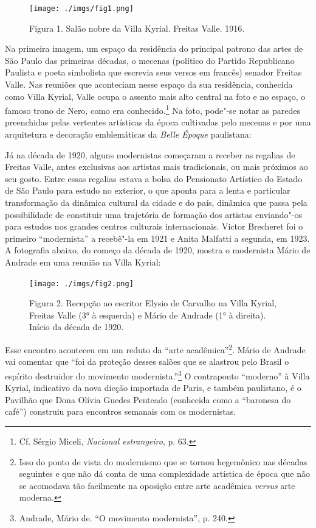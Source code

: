\begin{figure}[!ht]
\centering
 \texttt{[image: ./imgs/fig1.png]}
\caption{Figura 1. Salão nobre da Villa Kyrial. Freitas Valle. 1916.}
\end{figure}

Na primeira imagem, um espaço da residência do principal patrono das
artes de São Paulo das primeiras décadas, o mecenas (político do Partido
Republicano Paulista e poeta simbolista que escrevia seus versos em
francês) senador Freitas Valle. Nas reuniões que aconteciam nesse espaço
da sua residência, conhecida como Villa Kyrial, Valle ocupa o assento
mais alto central na foto e no espaço, o famoso trono de Nero, como era
conhecido.\footnote{Cf. Sérgio Miceli, \emph{Nacional estrangeiro}, p.
  63.} Na foto, pode"-se notar as paredes preenchidas pelas vertentes
artísticas da época cultivadas pelo mecenas e por uma arquitetura e
decoração emblemáticas da \emph{Belle Époque} paulistana:

Já na década de 1920, alguns modernistas começaram a receber as regalias
de Freitas Valle, antes exclusivas aos artistas mais tradicionais, ou
mais próximos ao seu gosto. Entre essas regalias estava a bolsa do
Pensionato Artístico do Estado de São Paulo para estudo no exterior, o
que aponta para a lenta e particular transformação da dinâmica cultural
da cidade e do país, dinâmica que passa pela possibilidade de constituir
uma trajetória de formação dos artistas enviando"-os para estudos nos
grandes centros culturais internacionais. Victor Brecheret foi o
primeiro ``modernista'' a recebê"-la em 1921 e Anita Malfatti a segunda,
em 1923. A fotografia abaixo, do começo da década de 1920, mostra o
modernista Mário de Andrade em uma reunião na Villa Kyrial:

\begin{figure}[!ht]
\centering
 \texttt{[image: ./imgs/fig2.png]}
\caption{Figura 2. Recepção ao escritor Elysio de Carvalho na Villa Kyrial,
Freitas Valle (3° à esquerda) e Mário de Andrade (1° à direita). Início
da década de 1920.}
\end{figure}


Esse encontro aconteceu em um reduto da ``arte acadêmica''\footnote{Isso
  do ponto de vista do modernismo que se tornou hegemônico nas décadas
  seguintes e que não dá conta de uma complexidade artística de época
  que não se acomodava tão facilmente na oposição entre arte acadêmica
  \emph{versus} arte moderna.}. Mário de Andrade vai comentar que ``foi
da proteção desses salões que se alastrou pelo Brasil o espírito
destruidor do movimento modernista.''\footnote{Andrade, Mário de. ``O
  movimento modernista'', p. 240.} O contraponto ``moderno'' à Villa
Kyrial, indicativo da nova dicção importada de Paris, e também
paulistano, é o Pavilhão que Dona Olívia Guedes Penteado (conhecida como
a ``baronesa do café'') construiu para encontros semanais com os
modernistas.

